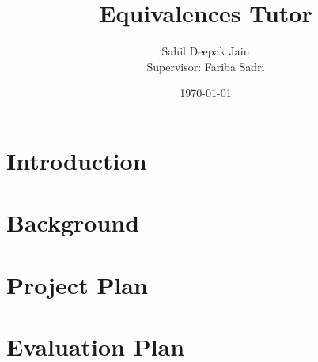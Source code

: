 \documentclass[11pt]{article}
\begin{document}
\title{Equivalences Tutor}

\author{Sahil Deepak Jain \\ Supervisor: Fariba Sadri}
\date{\today}

\maketitle
\newpage

\begin{abstract}

\end{abstract}
\newpage

\tableofcontents

\newpage

\section{Introduction}

\newpage

\section{Background}
\newpage

\section{Project Plan}

\newpage

\section{Evaluation Plan}

\newpage
\end{document}
